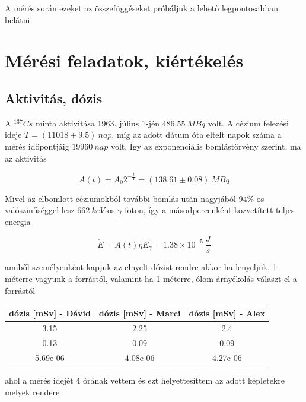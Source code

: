\documentclass[a4paper,12pt]{article}
\begin{document}
\par A mérés során ezeket az összefüggéseket próbáljuk a lehető legpontosabban belátni.

\section{Mérési feladatok, kiértékelés}

\subsection{Aktivitás, dózis}

\par A $^{137}Cs$ minta aktivitása 1963. július 1-jén $486.55~MBq$ volt. A cézium felezési ideje $T = (11018 \pm 9.5)~nap$, míg az adott dátum óta eltelt napok száma a mérés időpontjáig $19 960~nap$ volt. Így az exponenciális bomlástörvény szerint, ma az aktivitás

\begin{equation*}
	A(t) = A_{0}2^{-\frac{t}{T}} = (138.61 \pm 0.08)~MBq
\end{equation*}

\par Mivel az elbomlott céziumokból további bomlás után nagyjából $94\%$-os valószínűséggel lesz $662~keV$-os $\gamma$-foton, így a másodpercenként közvetített teljes energia

\begin{equation*}
	\dot{E} = A(t)\eta E_{\gamma} = 1.38 \times 10^{-5} ~\frac{J}{s} 
\end{equation*}

amiből személyenként kapjuk az elnyelt dózist rendre akkor ha lenyeljük, 1 méterre vagyunk a forrástól, valamint ha 1 méterre, ólom árnyékolás választ el a forrástól

\begin{center}
\begin{tabular}{|c|c|c|}
\hline
dózis [mSv] - Dávid & dózis [mSv] - Marci & dózis [mSv] - Alex \\
\hline
3.15 & 2.25 & 2.4 \\
\hline
0.13 & 0.09 & 0.09 \\
\hline
5.69e-06 & 4.08e-06 & 4.27e-06 \\
\hline
\end{tabular}
\end{center}

ahol a mérés idejét 4 órának vettem és ezt helyettesíttem az adott képletekre melyek rendere
\end{document}
